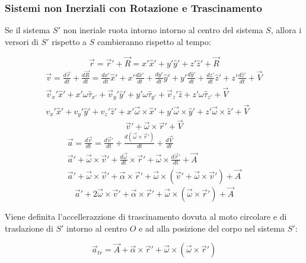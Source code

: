 \documentclass{article}
\numberwithin{equation}{subsection}
\begin{document}
\subsubsection{Sistemi non Inerziali con Rotazione e Trascinamento}
Se il sistema $S'$ non ineriale ruota intorno intorno al centro del 
sistema $S$, allora i versori di $S'$ rispetto a $S$ 
cambieranno rispetto al tempo:

\begin{equation}
    \vec{r}=\vec{r}'+\vec{R}=x'\hat{x}'+y'\hat{y}'+z'\hat{z}'+\vec{R}
\end{equation}
\begin{gather*}
    \vec{v}=\displaystyle\frac{d\vec{r}}{dt}+\frac{d\vec{R}}{dt}=\frac{dx'}{dt}\hat{x}'+x'\frac{d\hat{x}'}{dt}+\frac{dy'}{dt}\hat{y}'+y'\frac{d\hat{y}'}{dt}+\frac{dz'}{dt}\hat{z}'+z'\frac{d\hat{z}'}{dt}+\vec{V}\\
    \vec{v}_x'\hat{x}'+x'\omega\hat{\tau}_{x'}+\vec{v}_y'\hat{y}'+y'\omega\hat{\tau}_{y'}+\vec{v}_z'\hat{z}+z'\omega\hat{\tau}_{z'}+\vec{V}\\
    v_x'\hat{x}'+v_y'\hat{y}'+v_z'\hat{z}'+x'\vec{\omega}\times\hat{x}'+y'\vec{\omega}\times\hat{y}'+z'\vec{\omega}\times\hat{z}'+\vec{V}
\end{gather*}
\begin{equation}
    \vec{v}'+\vec{\omega}\times\vec{r}'+\vec{V}
\end{equation}
\begin{gather*}
    \vec{a}=\displaystyle\frac{d\vec{v}}{dt}=\frac{d\vec{v}'}{dt}+\frac{d(\vec{\omega}\times\vec{r}')}{dt}+\frac{d\vec{V}}{dt}\\
    \vec{a}'+\vec{\omega}\times\vec{v}'+\displaystyle\frac{d\vec{\omega}}{dt}\times\vec{r}'+\vec{\omega}\times\frac{d\vec{r}'}{dt}+\vec{A}\\
    \vec{a}'+\vec{\omega}\times\vec{v}'+\vec{\alpha}\times\vec{r}'+\vec{\omega}\times(\vec{v}'+\vec{\omega}\times\vec{v}')+\vec{A}
\end{gather*}
\begin{equation}
    \vec{a}'+2\vec{\omega}\times\vec{v}'+\vec{\alpha}\times\vec{r}'+\vec{\omega}\times(\vec{\omega}\times\vec{r}')+\vec{A}
\end{equation}

Viene definita l'accellerazzione di trascinamento dovuta al moto 
circolare e di traslazione di $S'$ intorno al centro $O$ e ad alla posizione del corpo nel sistema $S'$: 

\begin{equation}
    \vec{a}_{tr}=\vec{A}+\vec{\alpha}\times\vec{r}'+\vec{\omega}\times(\vec{\omega}\times\vec{r}')
\end{equation}
\end{document}
